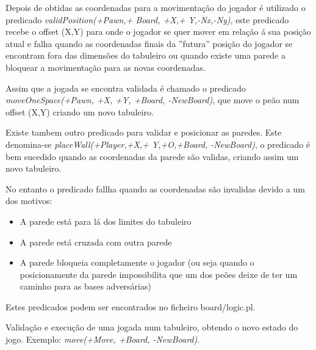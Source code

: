 \documentclass[a4paper]{article}
\begin{document}
Depois de obtidas as coordenadas para a movimentação do jogador é utilizado o predicado \textit{validPosition(+Pawn,+ Board, +X,+ Y,-Nx,-Ny)}, este predicado recebe o offset (X,Y) para onde o jogador se quer mover em relação á sua posição atual e falha quando as coordenadas finais da ''futura'' posição do jogador se encontram fora das dimensões do tabuleiro ou quando existe uma parede a bloquear a movimentação para as novas coordenadas.
\par Assim que a jogada se encontra validada é chamado o predicado \textit{moveOneSpace(+Pawn, +X, +Y, +Board, -NewBoard)}, que move o peão num offset (X,Y) criando um novo tabuleiro.
\par Existe tambem outro predicado para validar e posicionar as paredes. Este denomina-se \textit{placeWall(+Player,+X,+ Y,+O,+Board, -NewBoard)},  o predicado é bem sucedido quando as coordenadas da parede são validas, criando assim um novo tabuleiro.
\par No entanto o predicado fallha quando as coordenadas são invalidas devido a um dos motivos:
\begin{itemize}
	\item A parede está para lá dos limites do tabuleiro
	\item A parede está cruzada com outra parede
	\item A parede bloqueia completamente o jogador (ou seja quando o posicionamente da parede impossibilita que um dos peões deixe de ter um caminho para as bases adversárias)
\end{itemize}

Estes predicados podem ser encontrados no ficheiro board/logic.pl.


Validação e execução de uma jogada num tabuleiro, obtendo o novo estado do jogo. Exemplo: \textit{move(+Move, +Board, -NewBoard)}.
\end{document}
